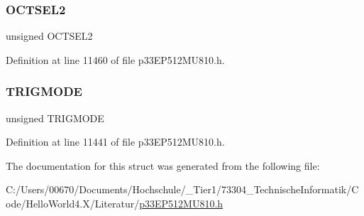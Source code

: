 \subsubsection{\texorpdfstring{O\+C\+T\+S\+E\+L2}{OCTSEL2}}
{\footnotesize\ttfamily unsigned O\+C\+T\+S\+E\+L2}



Definition at line 11460 of file p33\+E\+P512\+M\+U810.\+h.

\mbox{\label{structtag_o_c6_c_o_n1_b_i_t_s_a7a0057e0dca6e2663584b5b9e1da04c3}} 
\subsubsection{\texorpdfstring{T\+R\+I\+G\+M\+O\+DE}{TRIGMODE}}
{\footnotesize\ttfamily unsigned T\+R\+I\+G\+M\+O\+DE}



Definition at line 11441 of file p33\+E\+P512\+M\+U810.\+h.



The documentation for this struct was generated from the following file\+:\begin{DoxyCompactItemize}
\item 
C\+:/\+Users/00670/\+Documents/\+Hochschule/\+\_\+\+Tier1/73304\+\_\+\+Technische\+Informatik/\+Code/\+Hello\+World4.\+X/\+Literatur/\hyperlink{p33_e_p512_m_u810_8h}{p33\+E\+P512\+M\+U810.\+h}\end{DoxyCompactItemize}
